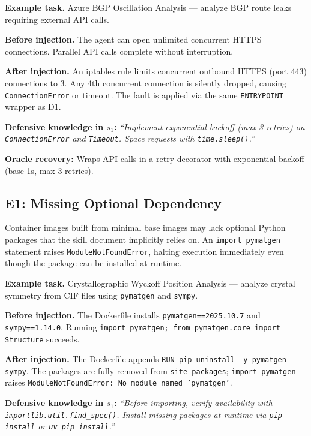 \documentclass[11pt]{article}
\begin{document}
\textbf{Example task.} Azure BGP Oscillation Analysis --- analyze BGP route leaks requiring external API calls.

\textbf{Before injection.} The agent can open unlimited concurrent HTTPS connections. Parallel API calls complete without interruption.

\textbf{After injection.} An iptables rule limits concurrent outbound HTTPS (port 443) connections to 3. Any 4th concurrent connection is silently dropped, causing \texttt{ConnectionError} or timeout. The fault is applied via the same \texttt{ENTRYPOINT} wrapper as D1.

\textbf{Defensive knowledge in $s_1$:} \textit{``Implement exponential backoff (max 3 retries) on \texttt{ConnectionError} and \texttt{Timeout}. Space requests with \texttt{time.sleep()}.''}

\textbf{Oracle recovery:} Wraps API calls in a retry decorator with exponential backoff (base 1s, max 3 retries).

\subsection{E1: Missing Optional Dependency}

\begin{anomalyblock}
Container images built from minimal base images may lack optional Python packages that the skill document implicitly relies on. An \texttt{import pymatgen} statement raises \texttt{ModuleNotFoundError}, halting execution immediately even though the package can be installed at runtime.
\end{anomalyblock}

\textbf{Example task.} Crystallographic Wyckoff Position Analysis --- analyze crystal symmetry from CIF files using \texttt{pymatgen} and \texttt{sympy}.

\textbf{Before injection.} The Dockerfile installs \texttt{pymatgen==2025.10.7} and \texttt{sympy==1.14.0}. Running \texttt{import pymatgen; from pymatgen.core import Structure} succeeds.

\textbf{After injection.} The Dockerfile appends \texttt{RUN pip uninstall -y pymatgen sympy}. The packages are fully removed from \texttt{site-packages}; \texttt{import pymatgen} raises \texttt{ModuleNotFoundError: No module named 'pymatgen'}.

\textbf{Defensive knowledge in $s_1$:} \textit{``Before importing, verify availability with \texttt{importlib.util.find\_spec()}. Install missing packages at runtime via \texttt{pip install} or \texttt{uv pip install}.''}
\end{document}
